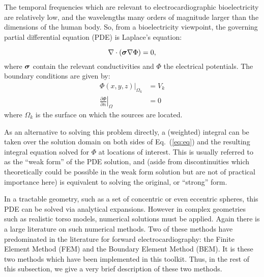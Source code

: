 The temporal frequencies which are relevant to electrocardiographic
bioelectricity are relatively low, and the wavelengths many orders of
magnitude larger than the dimensions of the human body. So, from a
bioelectricity viewpoint, the governing partial differential equation (PDE)
is Laplace's equation:

\begin{equation} \nabla \cdot (\mbox{\boldmath $\sigma$} \nabla \Phi) = 0, \label{eq:eq}
\end{equation}
\noindent where $\mbox{\boldmath $\sigma$}$ contain the relevant conductivities and $\Phi$ the
electrical potentials. The boundary conditions are given by:
\begin{align} \Phi(x,y,z)|_{\Omega_k} &= V_k\\ \left. \frac{\partial
\Phi}{\partial n} \right|_\Omega &= 0 \label{eq:bc}
\end{align}
\noindent where $\Omega_{k}$ is the surface on which the sources are located.

As an alternative to solving this problem directly, a (weighted) integral
can be taken over the solution domain on both sides of Eq.~(\ref{eq:eq})
and the resulting integral equation solved for $\Phi$ at locations of
interest. This is usually referred to as the ``weak form'' of the PDE
solution, and (aside from discontinuities which theoretically could be
possible in the weak form solution but are not of practical importance
here) is equivalent to solving the original, or ``strong'' form.

In a tractable geometry, such as a set of concentric or even eccentric
spheres, this PDE can be solved via analytical expansions. However in
complex geometries such as realistic torso models, numerical solutions must
be applied. Again there is a large literature on such numerical
methods. Two of these methods have predominated in the literature for
forward electrocardiography: the Finite Element Method (FEM) and the
Boundary Element Method (BEM). It is these two methods which have been
implemented in this toolkit. Thus, in the rest of this subsection, we give a
very brief description of these two methods.

